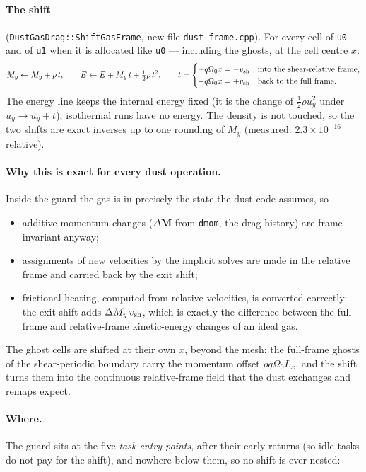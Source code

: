 \documentclass[11pt]{article}
\newcommand{\code}[1]{\texttt{#1}}
\newcommand{\file}[1]{\texttt{\small #1}}
\newcommand{\fn}[1]{\texttt{\small #1}}
\newcommand{\Om}{\Omega_0}
\newcommand{\qom}{q\Om}
\newcommand{\vsh}{v_{\rm sh}}
\begin{document}
\paragraph{The shift} (\fn{DustGasDrag::ShiftGasFrame}, new file \file{dust\_frame.cpp}).
For every cell of \code{u0} --- and of \code{u1} when it is allocated like \code{u0} ---
including the ghosts, at the cell centre $x$:
\begin{equation}
  M_y \leftarrow M_y + \rho\,t,\qquad
  E \leftarrow E + M_y\,t + \tfrac12\rho\,t^2,\qquad
  t = \begin{cases} +\qom x = -\vsh & \text{into the shear-relative frame,}\\
                    -\qom x = +\vsh & \text{back to the full frame.}\end{cases}
\end{equation}
The energy line keeps the internal energy fixed (it is the change of $\frac12\rho u_y^2$
under $u_y\to u_y+t$); isothermal runs have no energy.  The density is not touched, so the
two shifts are exact inverses up to one rounding of $M_y$ (measured: $2.3\times10^{-16}$
relative).

\paragraph{Why this is exact for every dust operation.}  Inside the guard the gas is in
precisely the state the dust code assumes, so
\begin{itemize}
\item additive momentum changes ($\Delta\mathbf{M}$ from \code{dmom}, the drag history)
  are frame-invariant anyway;
\item assignments of new velocities by the implicit solves are made in the relative
  frame and carried back by the exit shift;
\item frictional heating, computed from relative velocities, is converted correctly:
  the exit shift adds $\Delta M_y\,\vsh$, which is exactly the difference between the
  full-frame and relative-frame kinetic-energy changes of an ideal gas.
\end{itemize}
The ghost cells are shifted at their own $x$, beyond the mesh: the full-frame ghosts of
the shear-periodic boundary carry the momentum offset $\rho\qom L_x$, and the shift turns
them into the continuous relative-frame field that the dust exchanges and remaps expect.

\paragraph{Where.}  The guard sits at the five \emph{task entry points}, after their
early returns (so idle tasks do not pay for the shift), and nowhere below them, so no
shift is ever nested:
\end{document}
